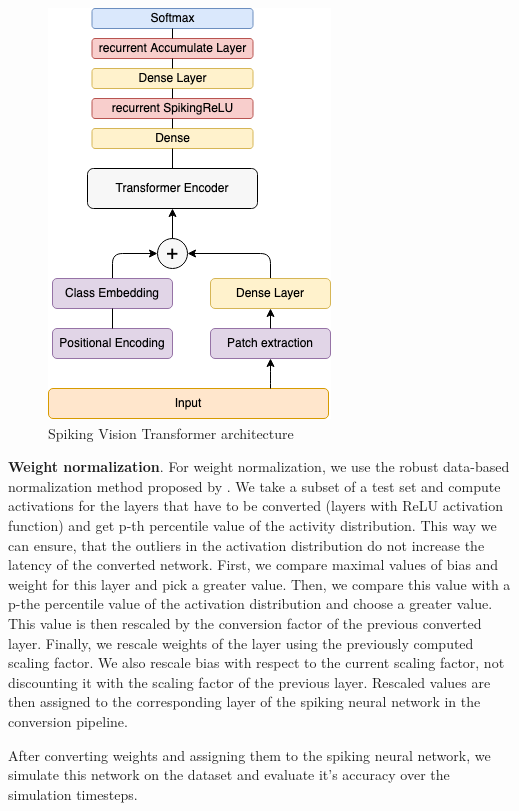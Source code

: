 \documentclass{article}
\begin{document}
\begin{figure}[b!]
\begin{center}
\includegraphics[width=0.5 \textwidth]{SpikingVisionTransformer.png}
\caption{Spiking Vision Transformer architecture}
\label{fig:vision_transformer}
\end{center}
\end{figure}

\textbf{Weight normalization}. For weight normalization, we use the robust data-based normalization method proposed by \cite{rueckauer2016theory}. We take a subset of a test set and compute activations for the layers that have to be converted (layers with ReLU activation function) and get p-th percentile value of the activity distribution. This way we can ensure, that the outliers in the activation distribution do not increase the latency of the converted network. First, we compare maximal values of bias and weight for this layer and pick a greater value. Then, we compare this value with a p-the percentile value of the activation distribution and choose a greater value. This value is then rescaled by the conversion factor of the previous converted layer. Finally, we rescale weights of the layer using the previously computed scaling factor. We also rescale bias with respect to the current scaling factor, not discounting it with the scaling factor of the previous layer. Rescaled values are then assigned to the corresponding layer of the spiking neural network in the conversion pipeline.

After converting weights and assigning them to the spiking neural network, we simulate this network on the dataset and evaluate it's accuracy over the simulation timesteps.
\end{document}
